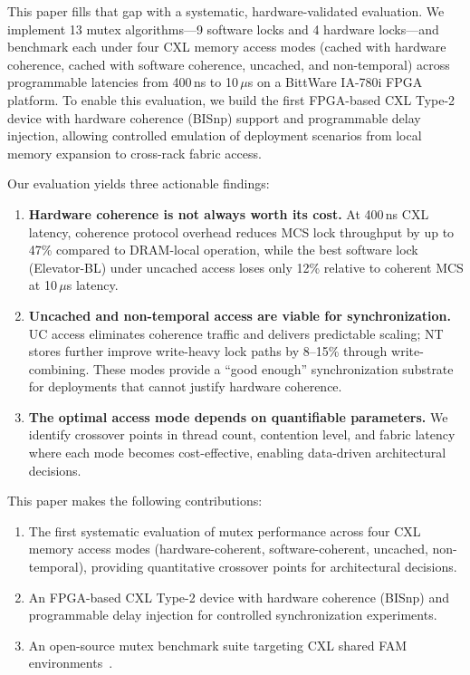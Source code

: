 This paper fills that gap with a systematic, hardware-validated evaluation.
We implement 13 mutex algorithms---9 software locks and 4 hardware locks---and benchmark each under four CXL memory access modes (cached with hardware coherence, cached with software coherence, uncached, and non-temporal) across programmable latencies from 400\,ns to 10\,$\mu$s on a BittWare IA-780i FPGA platform.
To enable this evaluation, we build the first FPGA-based CXL Type-2 device with hardware coherence (BISnp) support and programmable delay injection, allowing controlled emulation of deployment scenarios from local memory expansion to cross-rack fabric access.

Our evaluation yields three actionable findings:
\begin{enumerate}[noitemsep,topsep=4pt]
    \item \textbf{Hardware coherence is not always worth its cost.}
    At 400\,ns CXL latency, coherence protocol overhead reduces MCS lock throughput by up to 47\% compared to DRAM-local operation, while the best software lock (Elevator-BL) under uncached access loses only 12\% relative to coherent MCS at 10\,$\mu$s latency.
    \item \textbf{Uncached and non-temporal access are viable for synchronization.}
    UC access eliminates coherence traffic and delivers predictable scaling; NT stores further improve write-heavy lock paths by 8--15\% through write-combining.
    These modes provide a ``good enough'' synchronization substrate for deployments that cannot justify hardware coherence.
    \item \textbf{The optimal access mode depends on quantifiable parameters.}
    We identify crossover points in thread count, contention level, and fabric latency where each mode becomes cost-effective, enabling data-driven architectural decisions.
\end{enumerate}

This paper makes the following contributions:
\begin{enumerate}[noitemsep,topsep=4pt]
    \item The first systematic evaluation of mutex performance across four CXL memory access modes (hardware-coherent, software-coherent, uncached, non-temporal), providing quantitative crossover points for architectural decisions.
    \item An FPGA-based CXL Type-2 device with hardware coherence (BISnp) and programmable delay injection for controlled synchronization experiments.
    \item An open-source mutex benchmark suite targeting CXL shared FAM environments~\cite{ramosEIRNfMutex_benchmark2025}.
\end{enumerate}
